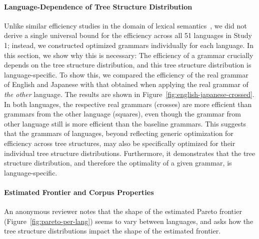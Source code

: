 \documentclass[10pt,twoside,lineno]{article}
\begin{document}
\paragraph{Language-Dependence of Tree Structure Distribution}
Unlike similar efficiency studies in the domain of lexical semantics~\cite{kemp2012kinship,regier2015word,zaslavsky2018efficient}, we did not derive a single universal bound for the efficiency across all 51 languages in Study 1; instead, we constructed optimized grammars individually for each language.
In this section, we show why this is necessary:
The efficiency of a grammar crucially depends on the tree structure distribution, and this tree structure distribution is language-specific.
To show this, we compared the efficiency of the real grammar of English and Japanese with that obtained when applying the real grammar of \emph{the other} language.
The results are shown in Figure~\ref{fig:english-japanese-crossed}.
In both languages, the respective real grammars (crosses) are more efficient than grammars from the other language (squares), even though the grammar from other language still is more efficient than the baseline grammars.
This suggests that the grammars of languages, beyond reflecting generic optimization for efficiency across tree structures, may also be specifically optimized for their individual tree structure distributions.
Furthermore, it demonstrates that the tree structure distribution, and therefore the optimality of a given grammar, is language-specific.





\paragraph{Estimated Frontier and Corpus Properties}
An anonymous reviewer notes that the shape of the estimated Pareto frontier (Figure~\ref{fig:pareto-per-lang}) seems to vary between languages, and asks how the tree structure distributions impact the shape of the estimated frontier.
\end{document}
